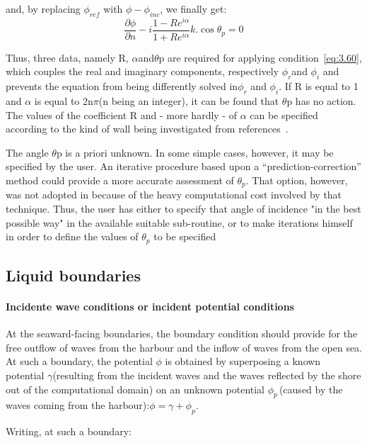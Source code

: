 and, by replacing $\phi_{ref}$ with $\phi-\phi_{inc}$, we finally get:
\begin{equation}
  \frac{\partial \phi}{\partial n} -  i\frac{1-Re^{i\alpha}}{1+Re^{i\alpha}}k.\cos\theta_p = 0
  \label{eq:3.60}
\end{equation}

Thus, three data, namely R, $\alpha$and$\theta$p are required for applying
condition~\ref{eq:3.60}, which couples the real and imaginary
components, respectively $\phi_{r}$and $\phi_{i}$ and prevents the
equation from being differently solved in$\phi_{r}$ and $\phi_{i}$. If
R is equal to 1 and $\alpha$ is equal to 2n$\pi$(n being an integer), it
can be found that $\theta$p has no action. The values of the coefficient R and
- more hardly - of $\alpha$ can be specified according to the kind of wall
being investigated from references~\cite{CERC1984}.

The angle $\theta$p is a priori unknown. In some simple cases, however, it may
be specified by the user. An iterative procedure based upon a
``prediction-correction'' method could provide a more accurate assessment of
$\theta_{p}$. That option, however, was not adopted in \artemis{}
because of the heavy computational cost involved by that technique. Thus, the
user has either to specify that angle of incidence "in the best possible way"
in the available suitable sub-routine, or to make iterations himself in order
to define the values of $\theta_p$ to be specified


\subsection{Liquid boundaries}


\paragraph{Incidente wave conditions or incident potential conditions}

At the seaward-facing boundaries, the boundary condition should provide for the
free outflow of waves from the harbour and the inflow of waves from the open
sea. At such a boundary, the potential $\phi$ is obtained by superposing a
known potential $\gamma$(resulting from the incident waves and the waves
reflected by the shore out of the computational domain) on an unknown potential
$\phi_{p\ }$(caused by the waves coming from the
harbour):$\phi=\gamma+\phi_{p}$.

Writing, at such a boundary:

